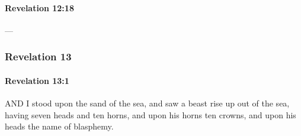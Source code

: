 		\paragraph{Revelation 12:18} %
			\label{REVELATIONNT-12-18}

			---

			\begin{framed}
			\scriptsize
				\begin{compactdesc}
					\item[SBLG] 
				\end{compactdesc}
			\end{framed}

	\subsubsection{Revelation 13} %
		\label{REVELATIONNT-13}
		
		\paragraph{Revelation 13:1} %
			\label{REVELATIONNT-13-1}

			AND I stood upon the sand of the sea, and saw a beast rise up out of the sea, having seven heads and ten horns, and upon his horns ten crowns, and upon his heads the name of blasphemy.

